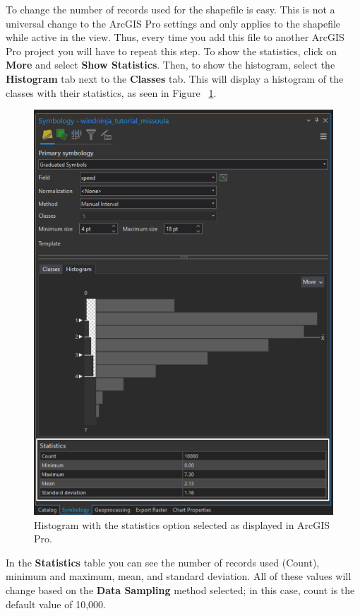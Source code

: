 \documentclass[12pt]{article}
\begin{document}
\pagebreak

To change the number of records used for the shapefile is easy. This is not a universal change to the ArcGIS Pro settings and only applies to the shapefile while active in the view. Thus, every time you add this file to another ArcGIS Pro project you will have to repeat this step. To show the statistics, click on \textbf{More} and select \textbf{Show Statistics}. Then, to show the histogram, select the \textbf{Histogram} tab next to the \textbf{Classes} tab. This will display a histogram of the classes with their statistics, as seen in Figure ~\ref{fig:Figure18}.

\begin{figure}[H]
	\centering
	\includegraphics[scale=0.42]{arc_18.png}
	\caption{Histogram with the statistics option selected as displayed in ArcGIS Pro.}
\label{fig:Figure18}
\end{figure}

In the \textbf{Statistics} table you can see the number of records used (Count), minimum and maximum, mean, and standard deviation. All of these values will change based on the \textbf{Data Sampling} method selected; in this case, count is the default value of 10,000.  
\end{document}
